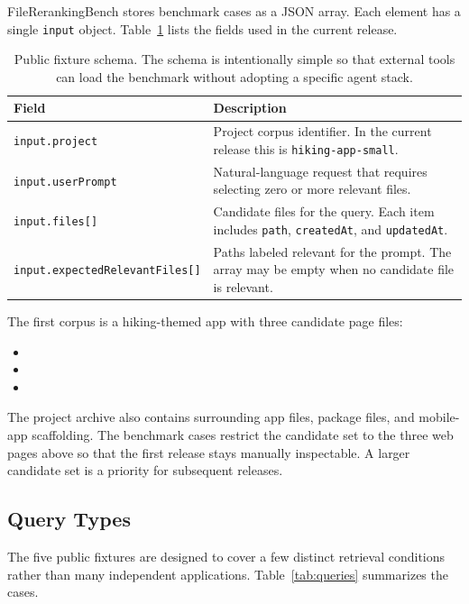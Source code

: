 \documentclass[11pt,a4paper]{article}
\begin{document}
FileRerankingBench stores benchmark cases as a JSON array. Each element has a
single \texttt{input} object. Table~\ref{tab:schema} lists the fields used in
the current release.

\begin{table}[h]
\centering
\small
\begin{tabularx}{\textwidth}{lX}
\toprule
Field & Description \\
\midrule
\texttt{input.project} & Project corpus identifier. In the current release this
is \texttt{hiking-app-small}. \\
\texttt{input.userPrompt} & Natural-language request that requires selecting
zero or more relevant files. \\
\texttt{input.files[]} & Candidate files for the query. Each item includes
\texttt{path}, \texttt{createdAt}, and \texttt{updatedAt}. \\
\texttt{input.expectedRelevantFiles[]} & Paths labeled relevant for the prompt.
The array may be empty when no candidate file is relevant. \\
\bottomrule
\end{tabularx}
\caption{Public fixture schema. The schema is intentionally simple so that
external tools can load the benchmark without adopting a specific agent stack.}
\label{tab:schema}
\end{table}

The first corpus is a hiking-themed app with three candidate page files:

\begin{itemize}[leftmargin=2em]
\item {}
\item {}
\item {}
\end{itemize}

The project archive also contains surrounding app files, package files, and
mobile-app scaffolding. The benchmark cases restrict the candidate set to the
three web pages above so that the first release stays manually inspectable. A
larger candidate set is a priority for subsequent releases.

\subsection{Query Types}

The five public fixtures are designed to cover a few distinct retrieval
conditions rather than many independent applications. Table~\ref{tab:queries}
summarizes the cases.
\end{document}
